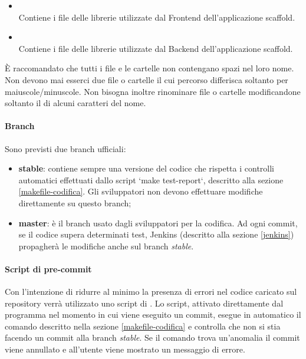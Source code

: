 \begin{itemize}
 \item \textbf{} \\
	Contiene i file delle librerie utilizzate dal Frontend dell'applicazione scaffold.
	
 \item \textbf{} \\
	Contiene i file delle librerie utilizzate dal Backend dell'applicazione scaffold.


\end{itemize}

È raccomandato che tutti i file e le cartelle non contengano spazi nel loro nome. Non devono mai esserci due file o cartelle il cui percorso differisca soltanto per maiuscole/minuscole. Non bisogna inoltre rinominare file o cartelle modificandone soltanto il  di alcuni caratteri del nome.

\paragraph{Branch}

Sono previsti due branch ufficiali:
\begin{itemize}
\item \textbf{stable}: contiene sempre una versione del codice che rispetta i controlli automatici effettuati dallo script `make test-report`, descritto alla sezione \ref{makefile-codifica}. Gli sviluppatori non devono effettuare modifiche direttamente su questo branch;

\item \textbf{master}: è il branch usato dagli sviluppatori per la codifica. Ad ogni commit, se il codice supera determinati test, Jenkins (descritto alla sezione \ref{jenkins}) propagherà le modifiche anche sul branch \emph{stable}.
\end{itemize}

\paragraph{Script di pre-commit}

Con l'intenzione di ridurre al minimo la presenza di errori nel codice caricato sul repository verrà utilizzato uno script di . Lo script, attivato direttamente dal programma  nel momento in cui viene eseguito un commit, esegue in automatico il comando  descritto nella sezione \ref{makefile-codifica} e controlla che non si stia facendo un commit alla branch \emph{stable}. Se il comando trova un'anomalia il commit viene annullato e all'utente viene mostrato un messaggio di errore.

